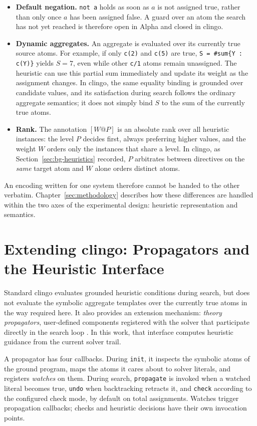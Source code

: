 \begin{itemize}
    \item \textbf{Default negation.} \texttt{not a} holds as soon as $a$ is not assigned true, rather than only once $a$ has been assigned false. A guard over an atom the search has not yet reached is therefore open in Alpha and closed in clingo.
    \item \textbf{Dynamic aggregates.} An aggregate is evaluated over its currently true source atoms. For example, if only \texttt{c(2)} and \texttt{c(5)} are true, \texttt{S = \#sum\{Y : c(Y)\}} yields $S=7$, even while other \texttt{c/1} atoms remain unassigned. The heuristic can use this partial sum immediately and update its weight as the assignment changes. In clingo, the same equality binding is grounded over candidate values, and its satisfaction during search follows the ordinary aggregate semantics; it does not simply bind $S$ to the sum of the currently true atoms.
    \item \textbf{Rank.} The annotation $[W@P]$ is an absolute rank over all heuristic instances: the level $P$ decides first, always preferring higher values, and the weight $W$ orders only the instances that share a level. In clingo, as Section~\ref{sec:bg-heuristics} recorded, $P$ arbitrates between directives on the \emph{same} target atom and $W$ alone orders distinct atoms.
\end{itemize}

An encoding written for one system therefore cannot be handed to the other verbatim. Chapter~\ref{sec:methodology} describes how these differences are handled within the two axes of the experimental design: heuristic representation and semantics.

\section{Extending clingo: Propagators and the Heuristic Interface}
\label{sec:bg-propagator}

Standard clingo evaluates grounded heuristic conditions during search, but does not evaluate the symbolic aggregate templates over the currently true atoms in the way required here. It also provides an extension mechanism: \emph{theory propagators}, user-defined components registered with the solver that participate directly in the search loop \cite{gebser2016theorySolving}. In this work, that interface computes heuristic guidance from the current solver trail.

A propagator has four callbacks. During \texttt{init}, it inspects the symbolic atoms of the ground program, maps the atoms it cares about to solver literals, and registers \emph{watches} on them. During search, \texttt{propagate} is invoked when a watched literal becomes true, \texttt{undo} when backtracking retracts it, and \texttt{check} according to the configured check mode, by default on total assignments. Watches trigger propagation callbacks; checks and heuristic decisions have their own invocation points.

